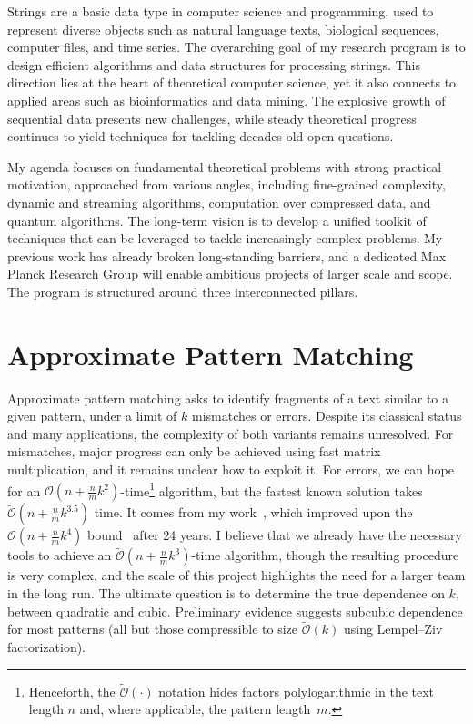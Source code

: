 \documentclass[a4paper,11pt]{article}
\newcommand{\Oh}{\mathcal{O}}
\newcommand{\Ohtilde}{\tilde{\mathcal{O}}}
\begin{document}
\thispagestyle{firststyle}
Strings are a basic data type in computer science and programming, used to represent diverse objects such as natural language texts, biological sequences, computer files, and time series. 
The overarching goal of my research program is to design efficient algorithms and data structures for processing strings. 
This direction lies at the heart of theoretical computer science, yet it also connects to applied areas such as bioinformatics and data mining. 
The explosive growth of sequential data presents new challenges, while steady theoretical progress continues to yield techniques for tackling decades-old open questions.

My agenda focuses on fundamental theoretical problems with strong practical motivation, approached from various angles, including fine-grained complexity, dynamic and streaming algorithms, computation over compressed data, and quantum algorithms.
The long-term vision is to develop a unified toolkit of techniques that can be leveraged to tackle increasingly complex problems. 
My previous work has already broken long-standing barriers, and a dedicated Max Planck Research Group will enable ambitious projects of larger scale and scope. 
The program is structured around three interconnected pillars.

\section{Approximate Pattern Matching}

Approximate pattern matching asks to identify fragments of a text similar to a given pattern, under a limit of $k$ mismatches or errors. 
Despite its classical status and many applications, the complexity of both variants remains unresolved. 
For mismatches, major progress can only be achieved using fast matrix multiplication, and it remains unclear how to exploit it. 
For errors, we can hope for an $\Ohtilde(n+\tfrac{n}{m}k^{2})$-time\footnote{Henceforth, the $\Ohtilde(\cdot)$ notation hides factors polylogarithmic in the text length $n$ and, where applicable, the pattern length~$m$.} algorithm, but the fastest known solution takes $\Ohtilde(n+\tfrac{n}{m}k^{3.5})$ time. 
It comes from my work~\cite{CKW22}, which improved upon the $\Oh(n+\tfrac{n}{m}k^4)$ bound~\cite{CH98} after 24 years.  
I believe that we already have the necessary tools to achieve an $\Ohtilde(n+\tfrac{n}{m}k^{3})$-time algorithm, though the resulting procedure is very complex, and the scale of this project highlights the need for a larger team in the long run.
The ultimate question is to determine the true dependence on $k$, between quadratic and cubic. 
Preliminary evidence suggests subcubic dependence for most patterns (all but those compressible to size $\Ohtilde(k)$ using Lempel--Ziv factorization).  
\end{document}
